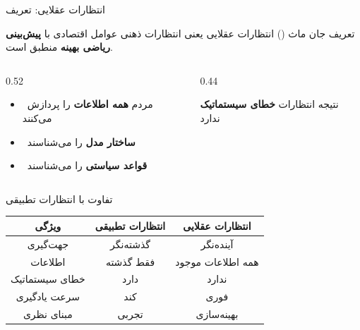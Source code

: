 \documentclass[aspectratio=169,11pt]{beamer}
\newcommand{\highlight}[1]{\textcolor{AccentOrange}{\textbf{#1}}}
\newcommand{\keyword}[1]{\textcolor{MainBlue}{\textbf{#1}}}
\begin{document}
\begin{frame}{انتظارات عقلایی: تعریف}
  \begin{block}{تعریف جان ماث ()}
    انتظارات عقلایی یعنی انتظارات ذهنی عوامل اقتصادی با \highlight{پیش‌بینی ریاضی بهینه} منطبق است.
  \end{block}
  \vspace{0.3cm}
  \begin{LTR}
  \begin{columns}[T]
    \begin{column}{0.52\textwidth}
      \begin{RTL}
      \begin{itemize}
        \item \faCheckCircle\ مردم \keyword{همه اطلاعات} را پردازش می‌کنند
        \item \faCheckCircle\ \keyword{ساختار مدل} را می‌شناسند
        \item \faCheckCircle\ \keyword{قواعد سیاستی} را می‌شناسند
      \end{itemize}
      \end{RTL}
    \end{column}
    \hfill
    \begin{column}{0.44\textwidth}
      \begin{RTL}
      \begin{exampleblock}{نتیجه}
        انتظارات \highlight{خطای سیستماتیک} ندارد
      \end{exampleblock}
      \end{RTL}
    \end{column}
  \end{columns}
  \end{LTR}
\end{frame}

\begin{frame}{تفاوت با انتظارات تطبیقی}
  \begin{center}
    \renewcommand{\arraystretch}{1.4}
    \begin{tabular}{ccc}
      \toprule
      \textbf{ویژگی} & \textbf{\textcolor{AlertRed}{انتظارات تطبیقی}} & \textbf{\textcolor{SuccessGreen}{انتظارات عقلایی}} \\
      \midrule
      جهت‌گیری        & گذشته‌نگر  & آینده‌نگر          \\
      اطلاعات        & فقط گذشته & همه اطلاعات موجود \\
      خطای سیستماتیک & دارد      & ندارد             \\
      سرعت یادگیری   & کند       & فوری              \\
      مبنای نظری     & تجربی     & بهینه‌سازی         \\
      \bottomrule
    \end{tabular}
  \end{center}
\end{frame}
\end{document}
